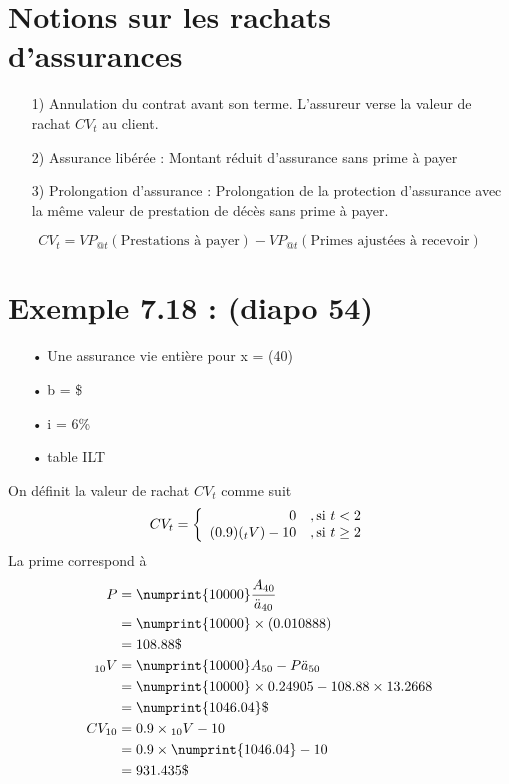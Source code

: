 \documentclass[11pt,french]{report}
\newcommand{\indiceGauche}[2]{{\vphantom{#2}}_{#1}#2}
\begin{document}
\section{Notions sur les rachats d'assurances}
\begin{itemize}
\item[1)] Annulation du contrat avant son terme. L'assureur verse la valeur de rachat $CV_t$ au client.
\item[2)] Assurance libérée : Montant réduit d'assurance sans prime à payer
\item[3)] Prolongation d'assurance : Prolongation de la protection d'assurance avec la même valeur de prestation de décès sans prime à payer.
\end{itemize}
\begin{equation}
CV_t = VP_{@t}(\text{Prestations à payer}) - VP_{@t}(\text{Primes ajustées à recevoir})
\end{equation}


\section{Exemple 7.18 : (diapo 54)}
\begin{itemize}
\item[•] Une assurance vie entière pour x = (40)
\item[•] b = \$
\item[•] i = 6\%
\item[•] table ILT
\end{itemize}
On définit la valeur de rachat $CV_t$ comme suit
\begin{align*}
CV_t = \left\{
     	\begin{array}{rl}
     	0   &, \text{si } t < 2 \\
		(0.9)(\indiceGauche{t}{V}) - 10 &, \text{si } t \geq 2 \\
     	\end{array}
     	\right.	
\end{align*}
La prime correspond à
\begin{align*}
P &= \numprint{10000} \frac{A_{40}}{\ddot{a}_{40}} \\
&= \numprint{10000} \times (0.010888) \\
&= 108.88 \$ \\
\indiceGauche{10}{V} &= \numprint{10000} A_{50} - P \ddot{a}_{50} \\
&= \numprint{10000} \times 0.24905 - 108.88 \times 13.2668 \\
&= \numprint{1046.04}\$ \\
CV_{10} &= 0.9 \times \indiceGauche{10}{V} - 10 \\
&= 0.9 \times \numprint{1046.04} - 10 \\
&=931.435 \$
\end{align*}
\end{document}

